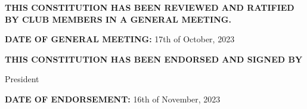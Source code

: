 \textbf{THIS CONSTITUTION HAS BEEN REVIEWED AND RATIFIED BY CLUB MEMBERS IN A GENERAL MEETING.}

\vspace{0.5cm}
\textbf{DATE OF GENERAL MEETING:} 17th of October, 2023

\vspace{0.5cm}
\textbf{THIS CONSTITUTION HAS BEEN ENDORSED AND SIGNED BY}

\signature{David Maslov}{President}

\vspace{0.5cm}
\textbf{DATE OF ENDORSEMENT:} 16th of November, 2023
